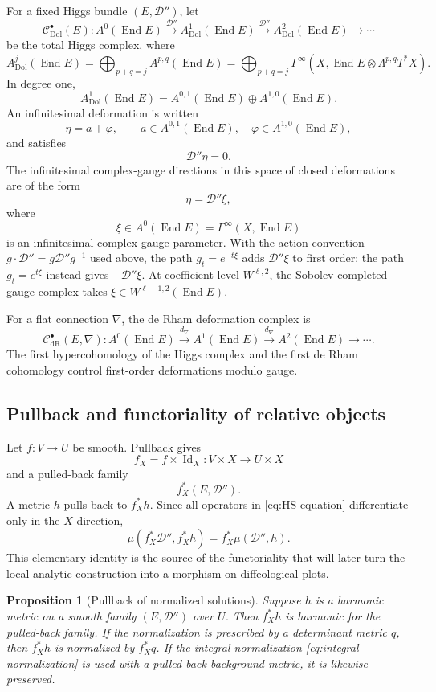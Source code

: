 \documentclass[11pt,reqno]{amsart}
\newtheorem{proposition}[theorem]{Proposition}
\theoremstyle{definition}
\theoremstyle{remark}
\newcommand{\cC}{\mathcal C}
\newcommand{\cD}{\mathcal D}
\newcommand{\End}{\operatorname{End}}
\newcommand{\Id}{\operatorname{Id}}
\newcommand{\Dol}{\mathrm{Dol}}
\newcommand{\dR}{\mathrm{dR}}
\newcommand{\xto}[1]{\xrightarrow{#1}}
\begin{document}
For a fixed Higgs bundle $(E,\cD'')$, let
\[
  \cC^\bullet_{\Dol}(E):
  A^0(\End E)
  \xto{\cD''}
  A^1_{\Dol}(\End E)
  \xto{\cD''}
  A^2_{\Dol}(\End E)\to\cdots
\]
be the total Higgs complex, where
\[
  A^j_{\Dol}(\End E)
  =\bigoplus_{p+q=j}A^{p,q}(\End E)
  =\bigoplus_{p+q=j}
  \Gamma^\infty\!\left(
    X,\End E\otimes\Lambda^{p,q}T^*X
  \right).
\]
In degree one,
\[
  A^1_{\Dol}(\End E)
  =A^{0,1}(\End E)\oplus A^{1,0}(\End E).
\]
An infinitesimal deformation is written
\[
  \eta=a+\varphi,
  \qquad
  a\in A^{0,1}(\End E),\quad
  \varphi\in A^{1,0}(\End E),
\]
and satisfies
\begin{equation}\label{eq:linearized-Higgs}
  \cD''\eta=0.
\end{equation}
The infinitesimal complex-gauge directions in this space of closed deformations are of the form
\[
  \eta=\cD''\xi,
\]
where
\[
  \xi\in A^0(\End E)=\Gamma^\infty(X,\End E)
\]
is an infinitesimal complex gauge parameter.  With the action convention
$g\cdot\cD''=g\cD''g^{-1}$ used above, the path $g_t=e^{-t\xi}$ adds
$\cD''\xi$ to first order; the path $g_t=e^{t\xi}$ instead gives
$-\cD''\xi$.  At coefficient level $W^{\ell,2}$, the
Sobolev-completed gauge complex takes
$\xi\in W^{\ell+1,2}(\End E)$.

For a flat connection $\nabla$, the de Rham deformation complex is
\[
  \cC^\bullet_{\dR}(E,\nabla):
  A^0(\End E)
  \xto{d_\nabla}
  A^1(\End E)
  \xto{d_\nabla}
  A^2(\End E)\to\cdots.
\]
The first hypercohomology of the Higgs complex and the first de Rham cohomology control first-order deformations modulo gauge.

\subsection{Pullback and functoriality of relative objects}

Let $f:V\to U$ be smooth.  Pullback gives
\[
  f_X=f\times\Id_X:V\times X\to U\times X
\]
and a pulled-back family
\[
  f_X^*(E,\cD'').
\]
A metric $h$ pulls back to $f_X^*h$.  Since all operators in \eqref{eq:HS-equation} differentiate only in the $X$-direction,
\begin{equation}\label{eq:pullback-moment}
  \mu(f_X^*\cD'',f_X^*h)=f_X^*\mu(\cD'',h).
\end{equation}
This elementary identity is the source of the functoriality that will later turn the local analytic construction into a morphism on diffeological plots.

\begin{proposition}[Pullback of normalized solutions]\label{prop:pullback-solutions}
Suppose $h$ is a harmonic metric on a smooth family $(E,\cD'')$ over $U$.  Then $f_X^*h$ is harmonic for the pulled-back family.  If the normalization is prescribed by a determinant metric $q$, then $f_X^*h$ is normalized by $f_X^*q$.  If the integral normalization \eqref{eq:integral-normalization} is used with a pulled-back background metric, it is likewise preserved.
\end{proposition}
\end{document}
